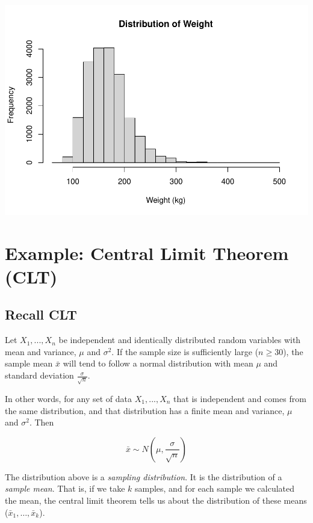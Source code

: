 \documentclass[
]{book}
\begin{document}
\includegraphics{_main_files/figure-latex/unnamed-chunk-225-1.pdf}

\hypertarget{example-central-limit-theorem-clt}{%
\section{Example: Central Limit Theorem (CLT)}\label{example-central-limit-theorem-clt}}

\hypertarget{recall-clt}{%
\subsection{Recall CLT}\label{recall-clt}}

Let \(X_1, ..., X_n\) be independent and identically distributed random variables with mean and variance, \(\mu\) and \(\sigma^2\). If the sample size is sufficiently large (\(n \geq 30\)), the sample mean \(\bar{x}\) will tend to follow a normal distribution with mean \(\mu\) and standard deviation \(\frac{\sigma}{\sqrt{n}}\).

In other words, for any set of data \(X_1, ..., X_n\) that is independent and comes from the same distribution, and that distribution has a finite mean and variance, \(\mu\) and \(\sigma^2\). Then

\[\bar{x} \sim N \left ( \mu, \frac{\sigma}{\sqrt{n}} \right ) \]

The distribution above is a \emph{sampling distribution}. It is the distribution of a \emph{sample mean}. That is, if we take \(k\) samples, and for each sample we calculated the mean, the central limit theorem tells us about the distribution of these means (\(\bar{x}_1, \dots, \bar{x}_k\)).
\end{document}

